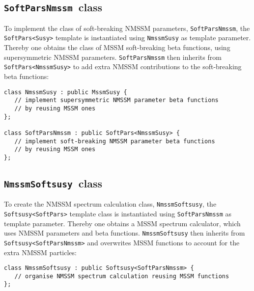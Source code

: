 \documentclass[final,3p,times,pdflatex]{elsarticle}
\def\code#1{\small{\tt #1}\normalsize}
\begin{document}
\subsection{\code{SoftParsNmssm}~class}
\label{nmssmsoftpars}

To implement the class of soft-breaking NMSSM parameters,
\code{SoftParsNmssm}, the \code{SoftPars<Susy>} template is
instantiated using \code{NmssmSusy} as template parameter.  Thereby
one obtains the class of MSSM soft-breaking beta functions, using
supersymmetric NMSSM parameters.  \code{SoftParsNmssm} then inherits
from \code{SoftPars<NmssmSusy>} to add extra NMSSM contributions to
the soft-breaking beta functions:
%
\begin{verbatim}
class NmssmSusy : public MssmSusy {
   // implement supersymmetric NMSSM parameter beta functions
   // by reusing MSSM ones
};

class SoftParsNmssm : public SoftPars<NmssmSusy> {
   // implement soft-breaking NMSSM parameter beta functions
   // by reusing MSSM ones
};
\end{verbatim}

\subsection{\code{NmssmSoftsusy}~class}
\label{nmssmsoftsusy}

To create the NMSSM spectrum calculation class, \code{NmssmSoftsusy},
the \code{Softsusy<SoftPars>} template class is instantiated using
\code{SoftParsNmssm} as template parameter.  Thereby one obtains a
MSSM spectrum calculator, which uses NMSSM parameters and beta
functions.  \code{NmssmSoftsusy} then inherits from
\code{Softsusy<SoftParsNmssm>} and overwrites MSSM functions to
account for the extra NMSSM particles:
%
\begin{verbatim}
class NmssmSoftsusy : public Softsusy<SoftParsNmssm> {
   // organise NMSSM spectrum calculation reusing MSSM functions
};
\end{verbatim}
\end{document}
